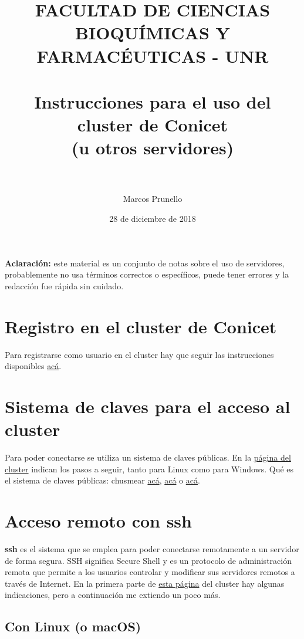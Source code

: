 \documentclass[paper=a4, fontsize=11pt]{article} %
\title{	
\normalfont \normalsize 
\textsc{FACULTAD DE CIENCIAS BIOQUÍMICAS Y FARMACÉUTICAS - UNR} \\ [25pt] %
\horrule{0.5pt} \\[0.4cm] %
\huge Instrucciones para el uso del cluster de Conicet\\ (u otros servidores) \\ %
\horrule{2pt} \\[0.5cm] %
}
\author{Marcos Prunello} %
\date{\normalsize 28 de diciembre de 2018} %
\numberwithin{equation}{section} %
\numberwithin{figure}{section} %
\numberwithin{table}{section} %
\begin{document}
\maketitle %

\textbf{Aclaración:} este material es un conjunto de notas sobre el uso de servidores, probablemente no usa términos correctos o específicos, puede tener errores y la redacción fue rápida sin cuidado.

\tableofcontents

\section{Registro en el cluster de Conicet}

Para registrarse como usuario en el cluster hay que seguir las instrucciones disponibles \href{http://cluster.rosario-conicet.gov.ar/cluster\_registracion.php}{acá}. 


\section{Sistema de claves para el acceso al cluster}

Para poder conectarse se utiliza un sistema de claves públicas. En la  \href{http://cluster.rosario-conicet.gov.ar/cluster\_registracion.php}{página del cluster} indican los pasos a seguir, tanto para Linux como para Windows. Qué es el sistema de claves públicas: chusmear \href{https://voragine.net/linux/acceso-ssh-seguro-servidor-autenticacion-clave-publica}{acá}, \href{https://www.hostinger.es/tutoriales/que-es-ssh#gref}{acá} o \href{https://es.wikipedia.org/wiki/Criptograf%C3%ADa_asim%C3%A9trica}{acá}.

\section{Acceso remoto con ssh}

\textbf{ssh} es el sistema que se emplea para poder conectarse remotamente a un servidor de forma segura. SSH significa Secure Shell y es un protocolo de administración remota que permite a los usuarios controlar y modificar sus servidores remotos a través de Internet. En la primera parte de \href{http://cluster.rosario-conicet.gov.ar/cluster_utilizacion.php}{esta página} del cluster hay algunas indicaciones, pero a continuación me extiendo un poco más.

\subsection{Con Linux (o macOS)}
\end{document}
